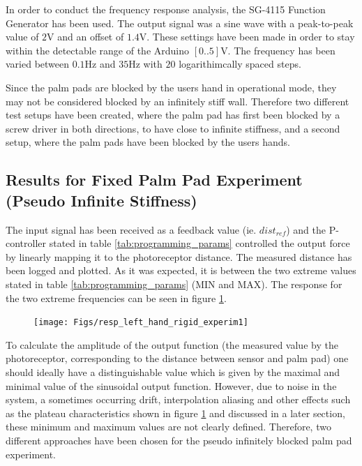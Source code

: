 	In order to conduct the frequency response analysis, the SG-4115 Function Generator has been used. The output signal was a sine wave with a peak-to-peak value of $2$V and an offset of $1.4$V. These settings have been made in order to stay within the detectable range of the Arduino $[0..5]$V. The frequency has been varied between $0.1$Hz and $35$Hz with $20$ logarithimcally spaced steps.
	
	Since the palm pads are blocked by the users hand in operational mode, they may not be considered blocked by an infinitely stiff wall. Therefore two different test setups have been created, where the palm pad has first been blocked by a screw driver in both directions, to have close to infinite stiffness, and a second setup, where the palm pads have been blocked by the users hands.
	
	\subsection{Results for Fixed Palm Pad Experiment (Pseudo Infinite Stiffness)}
	The input signal has been received as a feedback value (ie. $dist_{ref}$) and the P-controller stated in table \ref{tab:programming_params} controlled the output force by linearly mapping it to the photoreceptor distance. The measured distance has been logged and plotted. As it was expected, it is between the two extreme values stated in table \ref{tab:programming_params} (MIN and MAX). The response for the two extreme frequencies can be seen in figure \ref{fig:resp_left_hand_rigid_experim1}.
	\begin{figure}[h!]
		\centering
		\texttt{[image: Figs/resp\_left\_hand\_rigid\_experim1]}
		\caption{}
		\label{fig:resp_left_hand_rigid_experim1}
	\end{figure}
	
	
	To calculate the amplitude of the output function (the measured value by the photoreceptor, corresponding to the distance between sensor and palm pad) one should ideally have a distinguishable value which is given by the maximal and minimal value of the sinusoidal output function. However, due to noise in the system, a sometimes occurring drift, interpolation aliasing and other effects such as the plateau characteristics shown in figure \ref{fig:resp_left_hand_rigid_experim1} and discussed in a later section, these minimum and maximum values are not clearly defined. Therefore, two different approaches have been chosen for the pseudo infinitely blocked palm pad experiment.
	
